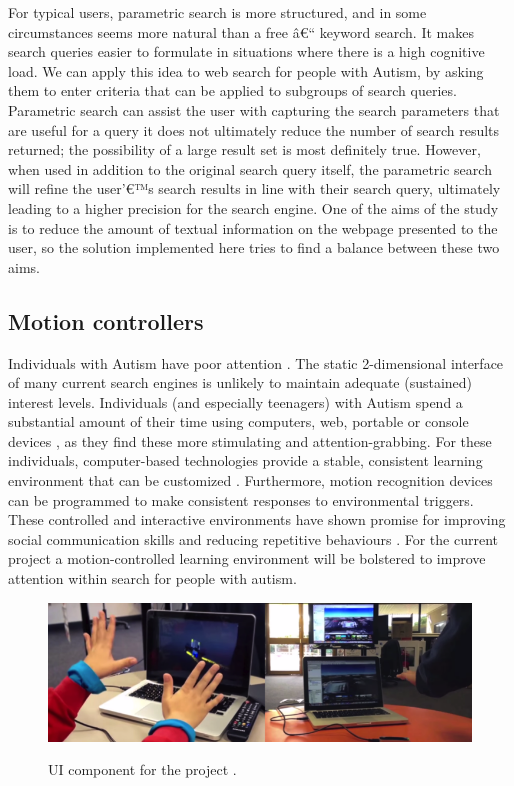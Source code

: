 \documentclass[a4paper, 11pt]{article}
\begin{document}
For typical users, parametric search is more structured, and in some circumstances seems more natural than a free â€“ keyword search. It makes search queries easier to formulate in situations where there is a high cognitive load.  We can apply this idea to web search for people with Autism, by asking them to enter criteria that can be applied to subgroups of search queries. Parametric search can assist the user with capturing the search parameters that are useful for a query it does not ultimately reduce the number of search results returned; the possibility of a large result set is most definitely true. However, when used in addition to the original search query itself, the parametric search will refine the user'€™s search results in line with their search query, ultimately leading to a higher precision for the search engine.
\vspace{5mm}
One of the aims of the study is to reduce the amount of textual information on the webpage presented to the user, so the solution implemented here tries to find a balance between these two aims.\\  


\subsection{Motion controllers}
Individuals with Autism have poor attention \cite{attention}. The static 2-dimensional interface of many current search engines is unlikely to maintain adequate (sustained) interest levels. Individuals (and especially teenagers) with Autism spend a substantial amount of their time using computers, web, portable or console devices \cite{Shane and Albert}, as they find these more stimulating and attention-grabbing. For these individuals, computer-based technologies provide a stable, consistent learning environment that can be customized \cite{moore}. Furthermore, motion recognition devices can be programmed to make consistent responses to environmental triggers. These controlled and interactive environments have shown promise for improving social communication skills and reducing repetitive behaviours \cite{gameshealth}. For the current project a motion-controlled learning environment will be bolstered to improve attention within search for people with autism. 

\begin{figure}[H]
\begin{center}
\includegraphics[scale=0.5]{vision}\\
\caption{UI component for the project \cite{leap}.}
\label{vision}
\end{center}
\end{figure}
\end{document}
